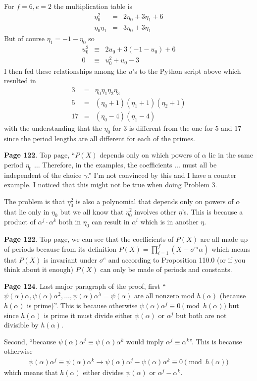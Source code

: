\documentclass[aps,preprint,preprintnumbers,nofootinbib,showpacs,prd]{revtex4-1}
\newcommand{\nbea}{\begin{eqnarray*}}
\newcommand{\neea}{\end{eqnarray*}}
\begin{document}
For $f = 6, e = 2$ the multiplication table is
%
\nbea
\eta_0^2 & = & 2\eta_0 + 3\eta_1 + 6 \\
\eta_0\eta_1 & = & 3\eta_0 + 3\eta_1
\neea
%
But of course $\eta_1 = -1 - \eta_0$ so
%
\nbea
u_0^2 & \equiv & 2u_0 + 3(-1-u_0) + 6 \\
0 & \equiv & u_0^2 + u_0 - 3
\neea
%
I then fed these relationships among the $u$'s to the Python script above which resulted in
%
\nbea
3 & = & \eta_0 \eta_1 \eta_2 \eta_3 \\
5 & = & (\eta_0 + 1)(\eta_1 + 1)(\eta_2 + 1) \\
17 & = & (\eta_0 - 4)(\eta_1 - 4)
\neea
%
with the understanding that the $\eta_0$ for 3 is different from the one for 5 and 17 since the period lengths are all different for each of the primes.

{\bf Page 122}. Top page, ``$P(X)$ depends only on which powers of $\alpha$ lie in the same period $\eta_0$ $\dots$ Therefore, in the examples, the coefficients $\dots$ must all be independent of the choice $\gamma$.'' I'm not convinced by this and I have a counter example. I noticed that this might not be true when doing Problem 3.

The problem is that $\eta_0^2$ is also a polynomial that depends only on powers of $\alpha$ that lie only in $\eta_0$ but we all know that $\eta_0^2$ involves other $\eta$'s. This is because a product of $\alpha^j\cdot\alpha^k$ both in $\eta_0$ can result in $\alpha^l$ which is in another $\eta$.

{\bf Page 122}. Top page, we can see that the coefficients of $P(X)$ are all made up of periods because from its definition $P(X) = \prod_{i=1}^f (X - \sigma^{ei} \alpha)$ which means that $P(X)$ is invariant under $\sigma^e$ and according to Proposition 110.0 (or if you think about it enough) $P(X)$ can only be made of periods and constants.

{\bf Page 124}. Last major paragraph of the proof, first ``$\psi(\alpha)\alpha,\psi(\alpha)\alpha^2,\dots,\psi(\alpha)\alpha^\lambda = \psi(\alpha)$ are all nonzero mod $h(\alpha)$ (because $h(\alpha)$ is prime)''. This is because otherwise $\psi(\alpha)\alpha^j \equiv 0 \pmod{h(\alpha)}$ but since $h(\alpha)$ is prime it must divide either $\psi(\alpha)$ or $\alpha^j$ but both are not divisible by $h(\alpha)$.

Second, ``because $\psi(\alpha)\alpha^j \equiv \psi(\alpha)\alpha^k$ would imply $\alpha^j \equiv \alpha^k$''. This is because otherwise
%
\nbea
\psi(\alpha)\alpha^j \equiv \psi(\alpha)\alpha^k \to \psi(\alpha)\alpha^j - \psi(\alpha)\alpha^k \equiv 0 \pmod{h(\alpha)}
\neea
%
which means that $h(\alpha)$ either divides $\psi(\alpha)$ or $\alpha^j - \alpha^k$.
\end{document}

